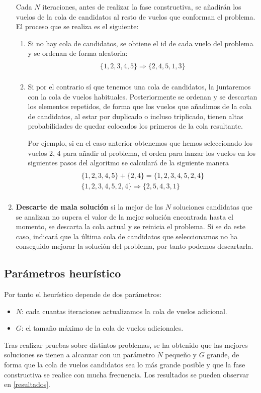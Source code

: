 \begin{enumerate}
		Cada $N$ iteraciones, antes de realizar la fase constructiva, se añadirán los vuelos de la cola de candidatos al resto de vuelos que conforman el problema. El proceso que se realiza es el siguiente:
	\begin{enumerate}
		\item Si no hay cola de candidatos, se obtiene el id de cada vuelo del problema y se ordenan de forma aleatoria:
		\begin{multline}\\
		\{1,2,3,4,5\} \Rightarrow \{2,4,5,1,3\}\\
		\end{multline}
		\item Si por el contrario sí que tenemos una cola de candidatos, la juntaremos con la cola de vuelos habituales. Posteriormente se ordenan y se descartan los elementos repetidos, de forma que los vuelos que añadimos de la cola de candidatos, al estar por duplicado o incluso triplicado, tienen altas probabilidades de quedar colocados los primeros de la cola resultante.
		
		Por ejemplo, si en el caso anterior obtenemos que hemos seleccionado los vuelos 2, 4 para añadir al problema, el orden para lanzar los vuelos en los siguientes pasos del algoritmo se calculará de la siguiente manera
		\begin{multline}\\
		\{1,2,3,4,5\} + \{2,4\} = \{1,2,3,4,5,2,4\} \\
		\{1,2,3,4,5,2,4\} \Rightarrow \{2,5,4,3,1\}  \\ 
		\end{multline}
	\end{enumerate}
	
	\item \textbf{Descarte de mala solución} si la mejor de las $N$ soluciones candidatas que se analizan no supera el valor de la mejor solución encontrada hasta el momento, se descarta la cola actual y se reinicia el problema.
	Si se da este caso, indicará que la última cola de candidatos que seleccionamos no ha conseguido mejorar la solución del problema, por tanto podemos descartarla.
\end{enumerate}


\subsection{Parámetros heurístico}
Por tanto el heurístico depende de dos parámetros:
\begin{itemize}
	\item \textbf{$N$}: cada cuantas iteraciones actualizamos la cola de vuelos adicional.
	\item \textbf{$G$}: el tamaño máximo de la cola de vuelos adicionales.
\end{itemize}
Tras realizar pruebas sobre distintos problemas, se ha obtenido que las mejores soluciones se tienen a alcanzar con un parámetro $N$ pequeño y $G$ grande, de forma que la cola de vuelos candidatos sea lo más grande posible y que la fase constructiva se realice con mucha frecuencia. Los resultados se pueden observar en \autoref{resultados}.

